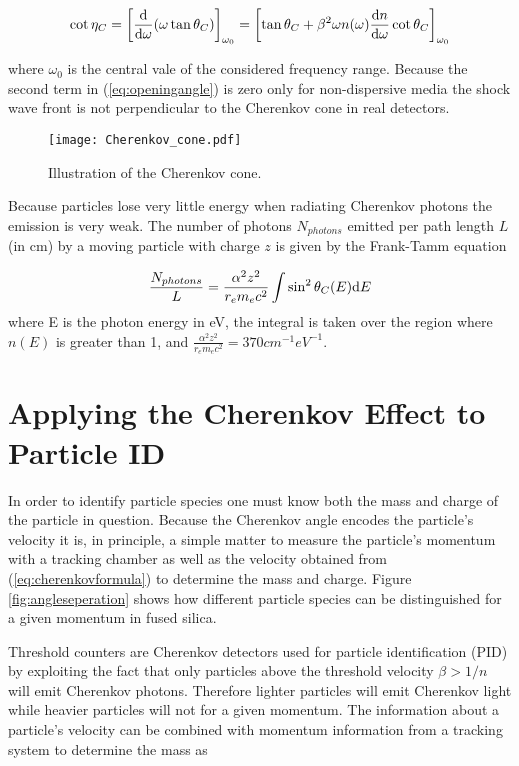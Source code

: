 \begin{equation}
	\cot\eta_C = \left[\frac{\mathrm{d}}{\mathrm{d}\omega}(\omega \tan\theta_{C}) \right]_{\omega_0} = \left[\tan\theta_{C} + \beta^2\omega n(\omega) \frac{\mathrm{d} n}{\mathrm{d}\omega}\cot\theta_{C} \right]_{\omega_0}
	\label{eq:openingangle}
\end{equation}

where $\omega_0$ is the central vale of the considered frequency range. Because the second term in (\ref{eq:openingangle}) is zero only for non-dispersive media the shock wave front is not perpendicular to the Cherenkov cone in real detectors.

\begin{figure}[ht]
	\centering
	\texttt{[image: Cherenkov\_cone.pdf]}
	\caption{Illustration of the Cherenkov cone.}
	\label{fig:cherenkovcone}
\end{figure}

Because particles lose very little energy when radiating Cherenkov photons the emission is very weak. The number of photons $N_{photons}$ emitted per path length $L$ (in cm) by a moving particle with charge $z$ is given by the Frank-Tamm equation

\begin{equation}
	\frac{N_{photons}}{L} = \frac{\alpha^2 z^2}{r_e m_e c^2} \int \sin^2\theta_{C} (E) \mathrm{d} E
	\label{eq:nphotons}
\end{equation}
where E is the photon energy in eV, the integral is taken over the region where $n(E)$ is greater than 1, and $\frac{\alpha^2 z^2}{r_e m_e c^2} = 370\unit{cm}^{-1}\unit{eV}^{-1}$.

\section{Applying the Cherenkov Effect to Particle ID}
In order to identify particle species one must know both the mass and charge of the particle in question. Because the Cherenkov angle encodes the particle's velocity it is, in principle, a simple matter to measure the particle's momentum with a tracking chamber as well as the velocity obtained from (\ref{eq:cherenkovformula}) to determine the mass and charge. Figure \ref{fig:angleseperation} shows how different particle species can be distinguished for a given momentum in fused silica.

Threshold counters are Cherenkov detectors used for particle identification (PID) by exploiting the fact that only particles above the threshold velocity $\beta > 1/n$ will emit Cherenkov photons. Therefore lighter particles will emit Cherenkov light while heavier particles will not for a given momentum. The information about a particle's velocity can be combined with momentum information from a tracking system to determine the mass as \cite{ParticleDetectionHandbook}

